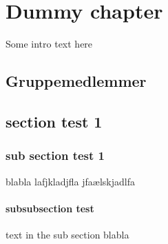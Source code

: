 \chapter{Dummy chapter}

Some intro text here
\section{Gruppemedlemmer}
\PrintGroupMembers
\section{section test 1}
\subsection{ sub section test 1}
blabla lafjkladjfla jfaælskjadlfa
\subsubsection{ subsubsection test }
text in the sub section blabla